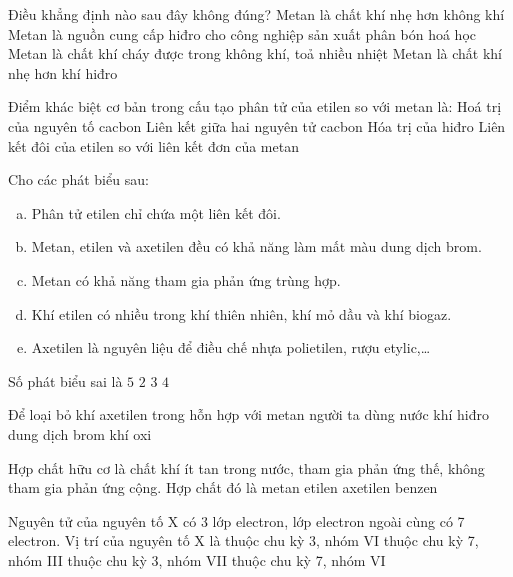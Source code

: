 \begin{ex}
	Điều khẳng định nào sau đây không đúng?
	\choice
	{Metan là chất khí nhẹ hơn không khí}
	{Metan là nguồn cung cấp hiđro cho công nghiệp sản xuất phân bón hoá học}
	{Metan là chất khí cháy được trong không khí, toả nhiều nhiệt}
	{\True Metan là chất khí nhẹ hơn khí hiđro}
	\loigiai{}
\end{ex}
\begin{ex}
	Điểm khác biệt cơ bản trong cấu tạo phân tử của etilen so với metan là:
	\choice
	{Hoá trị của nguyên tố cacbon}
	{Liên kết giữa hai nguyên tử cacbon}
	{Hóa trị của hiđro}
	{\True Liên kết đôi của etilen so với liên kết đơn của metan}
	\loigiai{}
\end{ex}
\begin{ex}
	Cho các phát biểu sau:
	\begin{enumerate}[(a)]
		\item  Phân tử etilen chỉ chứa một liên kết đôi.
		\item  Metan, etilen và axetilen đều có khả năng làm mất màu dung dịch brom.
		\item  Metan có khả năng tham gia phản ứng trùng hợp.
		\item  Khí etilen có nhiều trong khí thiên nhiên, khí mỏ dầu và khí biogaz.
		\item  Axetilen là nguyên liệu để điều chế nhựa polietilen, rượu etylic,{\dots}
	\end{enumerate}
	Số phát biểu sai là
	\choice
	{\True $5$}
	{$2$}
	{$3$}
	{$4$}
	\loigiai{}
\end{ex}
\begin{ex}
	Để loại bỏ khí axetilen trong hỗn hợp với metan người ta dùng
	\choice
	{nước}
	{khí hiđro}
	{\True dung dịch brom}
	{khí oxi}
	\loigiai{}
\end{ex}
\begin{ex}
	Hợp chất hữu cơ là chất khí ít tan trong nước, tham gia phản ứng thế, không tham gia phản ứng cộng. Hợp chất đó là
	\choice
	{\True metan}
	{etilen}
	{axetilen}
	{benzen}
	\loigiai{}
\end{ex}
\begin{ex}
	Nguyên tử của nguyên tố X có 3 lớp electron, lớp electron ngoài cùng có 7 electron. Vị trí của nguyên tố X là
	\choice
	{thuộc chu kỳ 3, nhóm VI}
	{thuộc chu kỳ 7, nhóm III}
	{\True thuộc chu kỳ 3, nhóm VII}
	{thuộc chu kỳ 7, nhóm VI}
	\loigiai{}
\end{ex}

